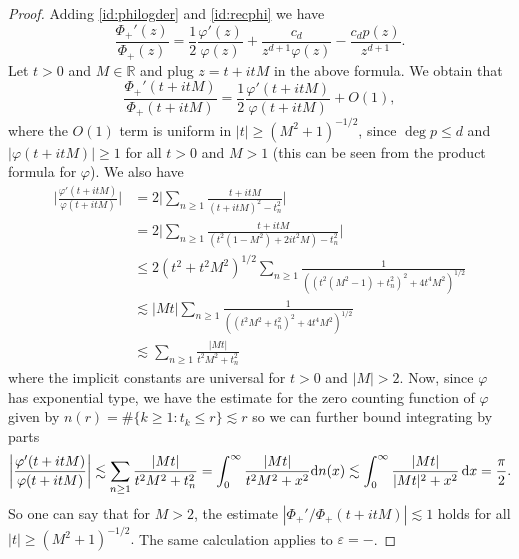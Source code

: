 \documentclass[a4paper,reqno,12pt]{amsart}
\renewcommand{\P}{\Phi}
\renewcommand{\r}{\mathbb{R}}
\newcommand{\ep}{\varepsilon}
\newcommand{\p}{\varphi}
\renewcommand{\d}{{\rm d}}
\begin{document}
\begin{proof}
Adding \eqref{id:philogder} and \eqref{id:recphi} we have
\begin{equation}\label{id:logDerPhiPlus}
    \frac{\Phi_+'(z)}{\P_+(z)}  = \frac{1}{2} \frac{\varphi'(z)}{\varphi(z)} + \frac{ c_d}{z^{d+1} \varphi(z)} - \frac{c_d p(z)}{z^{d+1}}.
\end{equation}
Let $t>0$ and $M \in \r$ and plug $z =t + i tM $ in the above formula. We obtain that
\begin{equation*}
    \frac{\Phi_+'(t + itM )}{\P_+(t + itM)}  = \frac{1}{2} \frac{\varphi'(t + itM )}{\varphi(t + itM )} + O(1),
\end{equation*}
where the $O(1)$ term is uniform in $|t| \geq (M^2 + 1)^{-1/2}$, since $\deg p \leq d$ and $|\varphi(t + it M)| \geq 1$ for all $t > 0$ and $M > 1$ (this can be seen from the product formula for $\p$).
We also have
\begin{align*}
    \bigg|\frac{\varphi'(t + itM)}{\varphi(t + itM)} \bigg|&=  2 \bigg|\sum_{n\geq 1} \frac{t + itM}{(t + itM)^2 - t_n^2}\bigg| \\
    &= 2 \bigg|\sum_{n\geq 1} \frac{t + itM}{(t^2(1- M^2) +2it^2M )- t_n^2}\bigg|\\
    &\leq 2(t^2 + t^2 M^2 )^{1/2} \sum_{n\geq 1} \frac{1 }{((t^2( M^2 -1) + t_n^2 )^2+ 4t^4 M^2)^{1/2}}\\
    &\lesssim |Mt| \sum_{n\geq 1} \frac{1 }{((t^2 M^2 + t_n^2 )^2+ 4t^4 M^2)^{1/2}}\\
    &\lesssim   \sum_{n\geq 1} \frac{|Mt| }{t^2 M^2 + t_n^2 } 
\end{align*}
where the implicit constants are universal for $t > 0$ and $|M| > 2$. Now, since $\p$ has exponential type, we have the estimate for the zero counting function of $\p$ given by $n(r) =  \# \{ k  \geq 1 : t_k \leq r \} \lesssim r$ so we can further bound integrating by parts
\begin{equation*}
    \bigg|\frac{\varphi'(t + itM)}{\varphi(t + itM)} \bigg| \lesssim \sum_{n\geq 1} \frac{|Mt| }{t^2 M^2 + t_n^2 }  =  \int_{0}^\infty \frac{|Mt| }{t^2 M^2 + x^2 } \d n(x)\lesssim \int_0^\infty \frac{|Mt|}{|Mt|^2 + x^2} \, \d x = \frac{\pi}{2}. 
\end{equation*}
So one can say that for $M > 2$, the estimate $|\P_+'/\P_+ (t +itM)| \lesssim 1$ holds for all $|t| \geq (M^2 + 1)^{-1/2}.$ The same calculation applies to $\ep = -$.



\end{proof}
\end{document}
